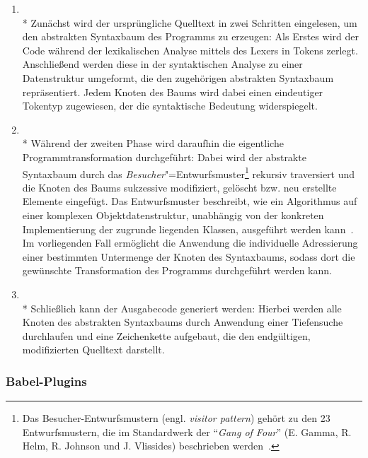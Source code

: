 \begin{enumerate}
  \item {}\\*
    Zunächst wird der ursprüngliche Quelltext in zwei Schritten eingelesen, um den abstrakten Syntaxbaum des Programms zu erzeugen: Als Erstes wird der Code während der lexikalischen Analyse mittels des Lexers in Tokens zerlegt. Anschließend werden diese in der syntaktischen Analyse zu einer Datenstruktur umgeformt, die den zugehörigen abstrakten Syntaxbaum repräsentiert. Jedem Knoten des Baums wird dabei einen eindeutiger Tokentyp zugewiesen, der die syntaktische Bedeutung widerspiegelt.
    \bigbreak
  \item {}\\*
    Während der zweiten Phase wird daraufhin die eigentliche Programmtransformation durchgeführt: Dabei wird der abstrakte Syntaxbaum durch das \emph{Besucher}"=Entwurfsmuster\footnote{Das Besucher-Entwurfsmustern (engl. \textit{visitor pattern}) gehört zu den 23 Entwurfsmustern, die im Standardwerk  der \enquote{\textit{Gang of Four}} (E. Gamma, R. Helm, R. Johnson und J. Vlissides) beschrieben werden~\autocite[306\psqq]{GAMMA:1994}.} rekursiv traversiert und die Knoten des Baums sukzessive modifiziert, gelöscht bzw. neu erstellte Elemente eingefügt. Das Entwurfsmuster beschreibt, wie ein Algorithmus auf einer komplexen Objektdatenstruktur, unabhängig von der konkreten Implementierung der zugrunde liegenden Klassen, ausgeführt werden kann~\autocite[634\psq]{FREEMAN:2004}. Im vorliegenden Fall ermöglicht die Anwendung die individuelle Adressierung einer bestimmten Untermenge der Knoten des Syntaxbaums, sodass dort die gewünschte Transformation des Programms durchgeführt werden kann.
    \bigbreak
  \item {}\\*
    Schließlich kann der Ausgabecode generiert werden: Hierbei werden alle Knoten des abstrakten Syntaxbaums durch Anwendung einer Tiefensuche durchlaufen und eine Zeichenkette aufgebaut, die den endgültigen, modifizierten Quelltext darstellt.
\end{enumerate}

\subsubsection{Babel-Plugins}
\label{subsec:babel-plugins}

